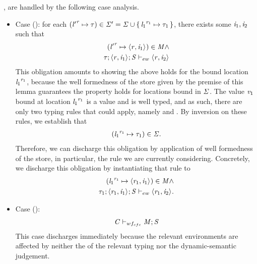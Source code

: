 \begin{nproof}
\begin{bcase}
\begin{itemize}
        ,
        are handled by the following case analysis.
    \begin{itemize}
      \item
      Case ():
      for each $({\mathit{l}'}^{\mathit{r}} \mapsto \mathit{\tau}) \in \mathit{\Sigma}' = \mathit{\Sigma} \cup \{ \, {\mathit{l}_1}^{\mathit{r}_1} \mapsto \mathit{\tau}_1 \,\}$, there exists some $\mathit{i}_1, \mathit{i}_2$ such that
      \begin{align*}
      ({\mathit{l}'}^{\mathit{r}} \mapsto \langle \mathit{r}, \mathit{i}_1 \rangle ^{}) \in \mathit{M} \wedge \\
        \mathit{\tau};\langle \mathit{r}, \mathit{i}_1 \rangle ^{};\mathit{S} \vdash_{ew} \langle \mathit{r}, \mathit{i}_2 \rangle ^{}
      \end{align*}
      This obligation amounts to showing the above holds for the bound location
      ${\mathit{l}_1}^{\mathit{r}_1}$, because the well formedness of the
      store given by the premise of this lemma guarantees the property
      holds for locations bound in $\mathit{\Sigma}$.
      The value $\mathit{v}_1$ bound at location ${\mathit{l}_1}^{\mathit{r}_1}$ is
      a value and is well typed, and as such, there are only two typing
      rules that could apply, namely \tvar{} and \tconcreteloc{}.
      By inversion on these rules, we establish that
      \begin{align*}
      ({\mathit{l}_1}^{\mathit{r}_1} \mapsto \mathit{\tau}_1) \in \mathit{\Sigma}.
      \end{align*}
      Therefore, we can discharge this obligation by application of well formedness of the
      store, in particular, the rule
       we
      are currently considering.
      Concretely, we discharge this obligation by instantiating that rule to
      \begin{align*}
      ({\mathit{l}_1}^{\mathit{r}_1} \mapsto \langle \mathit{r}_1, \mathit{i}_1 \rangle ^{}) \in \mathit{M} \wedge \\
        \mathit{\tau}_1;\langle \mathit{r}_1, \mathit{i}_1 \rangle ^{};\mathit{S} \vdash_{ew} \langle \mathit{r}_1, \mathit{i}_2 \rangle ^{}.
      \end{align*}
      \item Case ():
      \begin{align*}
      \mathit{C} \vdash_{wf_{cfc}} \mathit{M};\mathit{S}
      \end{align*}
      This case discharges immediately because the relevant environments
      are affected by neither the of the relevant typing nor the dynamic-semantic judgement.

\end{itemize}
\end{itemize}
\end{bcase}
\end{nproof}
